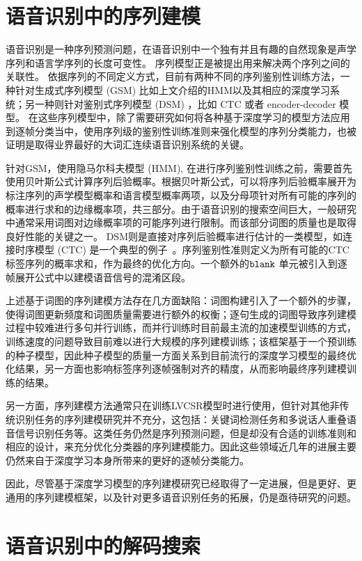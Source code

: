 \section{语音识别中的序列建模}
\label{chap:intro0-seq-model}

语音识别是一种序列预测问题，在语音识别中一个独有并且有趣的自然现象是声学序列和语言学序列的长度可变性。
序列模型正是被提出用来解决两个序列之间的关联性。
依据序列的不同定义方式，目前有两种不同的序列鉴别性训练方法，一种针对生成式序列模型 (GSM) 比如上文介绍的HMM以及其相应的深度学习系统；另一种则针对鉴别式序列模型 (DSM) ，比如 CTC 或者 encoder-decoder 模型。 
在这些序列模型中，除了需要研究如何将各种基于深度学习的模型方法应用到逐帧分类当中，使用序列级的鉴别性训练准则来强化模型的序列分类能力，也被证明是取得业界最好的大词汇连续语音识别系统的关键。

针对GSM，使用隐马尔科夫模型 (HMM), 在进行序列鉴别性训练之前，需要首先使用贝叶斯公式计算序列后验概率。根据贝叶斯公式，可以将序列后验概率展开为标注序列的声学模型概率和语言模型概率两项，以及分母项针对所有可能的序列的概率进行求和的边缘概率项，共三部分。由于语音识别的搜索空间巨大，一般研究中通常采用词图对边缘概率项的可能序列进行限制。而该部分词图的质量也是取得良好性能的关键之一。
%
DSM则是直接对序列后验概率进行估计的一类模型，如连接时序模型 (CTC) 是一个典型的例子~\cite{graves2006connectionist,huang2018ctc}。序列鉴别性准则定义为所有可能的CTC标签序列的概率求和，作为最终的优化方向。一个额外的$\tt blank$ 单元被引入到逐帧展开公式中以建模语音信号的混淆区段。

上述基于词图的序列建模方法存在几方面缺陷：词图构建引入了一个额外的步骤，使得词图更新频度和词图质量需要进行额外的权衡；逐句生成的词图导致序列建模过程中较难进行多句并行训练，而并行训练时目前最主流的加速模型训练的方式，训练速度的问题导致目前难以进行大规模的序列建模训练；该框架基于一个预训练的种子模型，因此种子模型的质量一方面关系到目前流行的深度学习模型的最终优化结果，另一方面也影响标签序列逐帧强制对齐的精度，从而影响最终序列建模训练的结果。

另一方面，序列建模方法通常只在训练LVCSR模型时进行使用，但针对其他非传统识别任务的序列建模研究并不充分，这包括：关键词检测任务和多说话人重叠语音信号识别任务等。这类任务仍然是序列预测问题，但是却没有合适的训练准则和相应的设计，来充分优化分类器的序列建模能力。因此这些领域近几年的进展主要仍然来自于深度学习本身所带来的更好的逐帧分类能力。

因此，尽管基于深度学习模型的序列建模研究已经取得了一定进展，但是更好、更通用的序列建模框架，以及针对更多语音识别任务的拓展，仍是亟待研究的问题。


\section{语音识别中的解码搜索}
\label{chap:intro0-inf}

